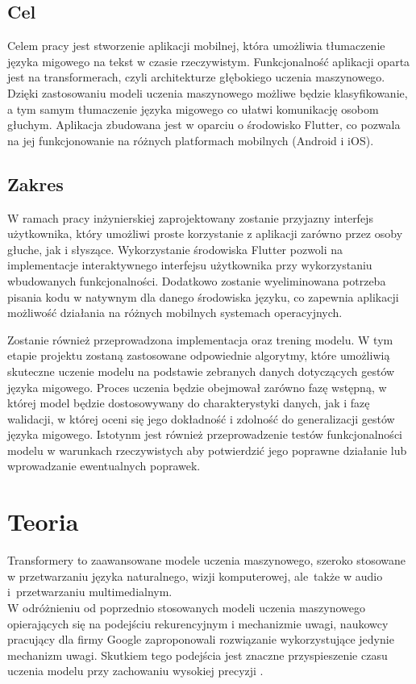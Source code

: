 \documentclass[12pt,a4paper,twoside]{book} %
\begin{document}
\section{Cel}\label{sec:aim}

Celem pracy jest stworzenie aplikacji mobilnej, która umożliwia tłumaczenie języka migowego na tekst w czasie rzeczywistym.
Funkcjonalność aplikacji oparta jest na transformerach, czyli architekturze głębokiego uczenia maszynowego.
Dzięki zastosowaniu modeli uczenia maszynowego możliwe będzie klasyfikowanie, a tym samym tłumaczenie języka migowego co ułatwi komunikację osobom głuchym.
Aplikacja zbudowana jest w oparciu o środowisko Flutter, co pozwala na jej funkcjonowanie na różnych platformach mobilnych (Android i iOS).

\section{Zakres}\label{sec:scope}

W ramach pracy inżynierskiej zaprojektowany zostanie przyjazny interfejs użytkownika, który umożliwi proste korzystanie z aplikacji zarówno przez osoby głuche, jak i słyszące.
Wykorzystanie środowiska Flutter pozwoli na implementacje interaktywnego interfejsu użytkownika przy wykorzystaniu wbudowanych funkcjonalności.
Dodatkowo zostanie wyeliminowana potrzeba pisania kodu w natywnym dla danego środowiska języku, co zapewnia aplikacji możliwość działania na różnych mobilnych systemach operacyjnych.

Zostanie również przeprowadzona implementacja oraz trening modelu.
W tym etapie projektu zostaną zastosowane odpowiednie algorytmy, które umożliwią skuteczne uczenie modelu na podstawie zebranych danych dotyczących gestów języka migowego.
Proces uczenia będzie obejmował zarówno fazę wstępną, w której model będzie dostosowywany do charakterystyki danych, jak i fazę walidacji, w której oceni się jego dokładność i zdolność do generalizacji gestów języka migowego.
Istotynm jest również przeprowadzenie testów funkcjonalności modelu w warunkach rzeczywistych aby potwierdzić jego poprawne działanie lub wprowadzanie ewentualnych poprawek.  

\chapter{Teoria}

Transformery to zaawansowane modele uczenia maszynowego, szeroko stosowane w przetwarzaniu języka naturalnego, wizji komputerowej, ale~także w audio i~przetwarzaniu multimedialnym. \\ 
W odróżnieniu od poprzednio stosowanych modeli uczenia maszynowego opierających się na podejściu rekurencyjnym i mechanizmie uwagi, naukowcy pracujący dla firmy Google zaproponowali rozwiązanie wykorzystujące jedynie mechanizm uwagi. Skutkiem tego podejścia jest znaczne przyspieszenie czasu uczenia modelu przy zachowaniu wysokiej precyzji \cite{vaswani2023attentionneed}.
\end{document}

